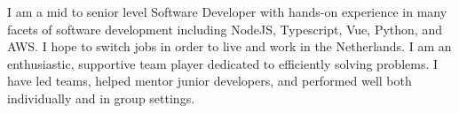 
\begin{cvparagraph}
I am a mid to senior level Software Developer with hands-on experience in many facets of software development including
NodeJS, Typescript, Vue, Python, and AWS.  
I hope to switch jobs in order to live and work in the Netherlands.
I am an enthusiastic, supportive team player dedicated to efficiently solving problems.
I have led teams, helped mentor junior developers, and performed well both individually and in group settings.
\end{cvparagraph}